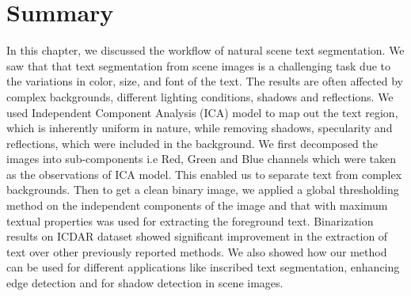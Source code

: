 \section{Summary}

In this chapter, we discussed the workflow of natural scene text segmentation.
We saw that that text segmentation 
from scene images is a challenging task due to the variations in color, size, and font
of the text. The results are often affected by complex backgrounds, 
different lighting conditions, shadows and reflections.
We used Independent Component Analysis (ICA) model to map out the text
region, which is inherently uniform in nature, while removing
shadows, specularity and reflections, which were included in
the background.
We first decomposed the images into sub-components i.e Red, Green and Blue channels which
were taken as the observations of ICA model.
This enabled us to separate text from complex backgrounds. 
Then to get a clean binary image, we applied a global thresholding method on the independent components of the image
and that with maximum textual properties was used for extracting the foreground text. Binarization results
on ICDAR dataset showed 
significant improvement in the extraction of text over other previously reported methods.
We also showed how our method can be used for different applications like inscribed text
segmentation, enhancing edge detection and for shadow detection in scene images.



